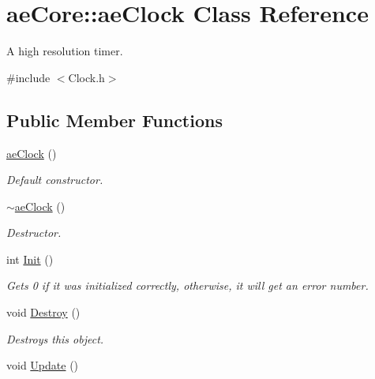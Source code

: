 \hypertarget{classae_core_1_1ae_clock}{}\section{ae\+Core\+:\+:ae\+Clock Class Reference}
\label{classae_core_1_1ae_clock}


A high resolution timer.  




{\ttfamily \#include $<$Clock.\+h$>$}

\subsection*{Public Member Functions}
\begin{DoxyCompactItemize}
\item 
\hyperlink{classae_core_1_1ae_clock_acce423a302fdb8c3cbbdc9f16cc92b4d}{ae\+Clock} ()\hypertarget{classae_core_1_1ae_clock_acce423a302fdb8c3cbbdc9f16cc92b4d}{}\label{classae_core_1_1ae_clock_acce423a302fdb8c3cbbdc9f16cc92b4d}

\begin{DoxyCompactList}\small\item\em Default constructor. \end{DoxyCompactList}\item 
\hyperlink{classae_core_1_1ae_clock_ab5fb0b048af4531eb109d5e20759bdf0}{$\sim$ae\+Clock} ()\hypertarget{classae_core_1_1ae_clock_ab5fb0b048af4531eb109d5e20759bdf0}{}\label{classae_core_1_1ae_clock_ab5fb0b048af4531eb109d5e20759bdf0}

\begin{DoxyCompactList}\small\item\em Destructor. \end{DoxyCompactList}\item 
int \hyperlink{classae_core_1_1ae_clock_a43da19cb58c81e07cddb5097a191748d}{Init} ()
\begin{DoxyCompactList}\small\item\em Gets 0 if it was initialized correctly, otherwise, it will get an error number. \end{DoxyCompactList}\item 
void \hyperlink{classae_core_1_1ae_clock_a87f4a727d750d3cfbbad04317ac0d0d2}{Destroy} ()\hypertarget{classae_core_1_1ae_clock_a87f4a727d750d3cfbbad04317ac0d0d2}{}\label{classae_core_1_1ae_clock_a87f4a727d750d3cfbbad04317ac0d0d2}

\begin{DoxyCompactList}\small\item\em Destroys this object. \end{DoxyCompactList}\item 
void \hyperlink{classae_core_1_1ae_clock_a3c9c48beb78aae34dbe6b1c84a5e08cf}{Update} ()\hypertarget{classae_core_1_1ae_clock_a3c9c48beb78aae34dbe6b1c84a5e08cf}{}\label{classae_core_1_1ae_clock_a3c9c48beb78aae34dbe6b1c84a5e08cf}


\end{DoxyCompactItemize}
